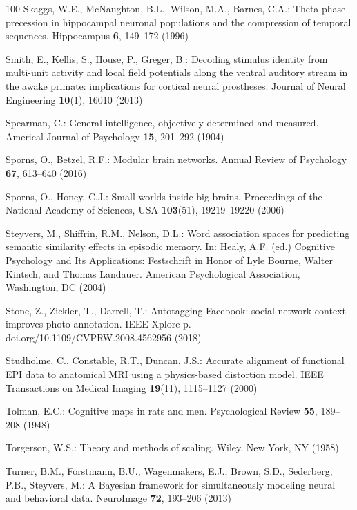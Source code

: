 \documentclass{llmxive}
\begin{document}
\begin{thebibliography}{100}
Skaggs, W.E., Mc{N}aughton, B.L., Wilson, M.A., Barnes, C.A.: Theta phase
  precession in hippocampal neuronal populations and the compression of
  temporal sequences. Hippocampus  \textbf{6},  149--172 (1996)

Smith, E., Kellis, S., House, P., Greger, B.: Decoding stimulus identity from
  multi-unit activity and local field potentials along the ventral auditory
  stream in the awake primate: implications for cortical neural prostheses.
  Journal of Neural Engineering  \textbf{10}(1),  16010 (2013)

Spearman, C.: General intelligence, objectively determined and measured.
  Americal Journal of Psychology  \textbf{15},  201--292 (1904)

Sporns, O., Betzel, R.F.: Modular brain networks. Annual Review of Psychology
  \textbf{67},  613--640 (2016)

Sporns, O., Honey, C.J.: Small worlds inside big brains. Proceedings of the
  National Academy of Sciences, {USA}  \textbf{103}(51),  19219--19220 (2006)

Steyvers, M., Shiffrin, R.M., Nelson, D.L.: Word association spaces for
  predicting semantic similarity effects in episodic memory. In: Healy, A.F.
  (ed.) Cognitive Psychology and Its Applications: Festschrift in Honor of Lyle
  Bourne, {Walter} {Kintsch}, and {Thomas} {Landauer}. {American} Psychological
  Association, Washington, {DC} (2004)

Stone, Z., Zickler, T., Darrell, T.: Autotagging {Facebook}: social network
  context improves photo annotation. {IEEE} {Xplore} p.
  doi.org/10.1109/CVPRW.2008.4562956 (2018)

Studholme, C., Constable, R.T., Duncan, J.S.: Accurate alignment of functional
  {EPI} data to anatomical {MRI} using a physics-based distortion model. {IEEE}
  Transactions on Medical Imaging  \textbf{19}(11),  1115--1127 (2000)

Tolman, E.C.: Cognitive maps in rats and men. Psychological Review
  \textbf{55},  189--208 (1948)

Torgerson, W.S.: Theory and methods of scaling. Wiley, New York, {NY} (1958)

Turner, B.M., Forstmann, B.U., Wagenmakers, E.J., Brown, S.D., Sederberg, P.B.,
  Steyvers, M.: A {B}ayesian framework for simultaneously modeling neural and
  behavioral data. {NeuroImage}  \textbf{72},  193--206 (2013)


\end{thebibliography}
\end{document}
